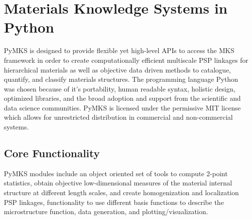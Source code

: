 \documentclass{bmcart}
\begin{document}


\section{Materials Knowledge Systems in Python}

PyMKS is designed to provide flexible yet high-level APIs to access the MKS framework in order to create computationally efficient multiscale PSP linkages for hierarchical materials as well as objective data driven methods to catalogue, quantify, and classify materials structures. The programming language Python was chosen because of it's portability, human readable syntax, holistic design, optimized libraries, and the  broad adoption and support from the scientific and data science communities. PyMKS is licensed under the permissive MIT license \cite{MIT} which allows for unrestricted distribution in commercial and non-commercial systems.

\subsection{Core Functionality}

PyMKS modules include an object oriented set of tools to compute 2-point statistics, obtain objective low-dimensional measures of the material internal structure at different length scales, and create homogenization and localization PSP linkages, functionality to use different basis functions to describe the microstructure function, data generation, and plotting/visualization. 
\end{document}

